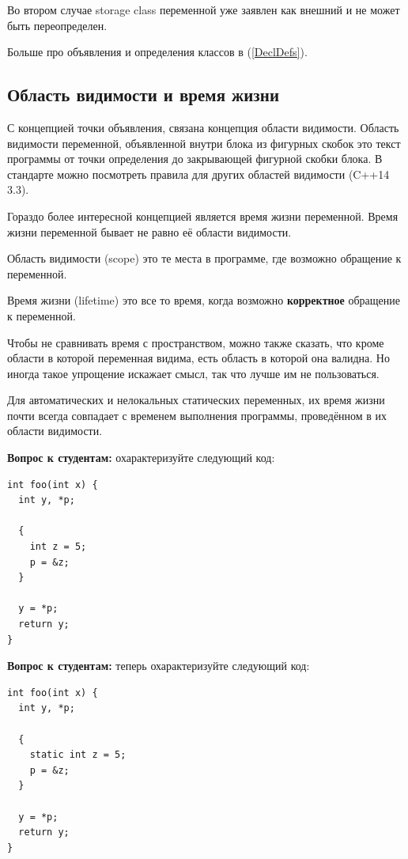 \documentclass[a4paper,12pt,oneside]{book}
\newif\ifanswers
\begin{document}
Во втором случае storage class переменной уже заявлен как внешний и не может быть переопределен.

Больше про объявления и определения классов в (\ref{DeclDefs}).

\subsection{Область видимости и время жизни}\label{ScopeLifeTime}

С концепцией точки объявления, связана концепция области видимости. Область видимости  переменной, объявленной внутри блока из фигурных скобок это текст программы от точки определения до закрывающей фигурной скобки блока. В стандарте можно посмотреть правила для других областей видимости (C++14 3.3).

Гораздо более интересной концепцией является время жизни переменной. Время жизни переменной бывает не равно её области видимости.

Область видимости (scope) это те места в программе, где возможно обращение к переменной.

Время жизни (lifetime) это все то время, когда возможно \textbf{корректное} обращение к переменной.

Чтобы не сравнивать время с пространством, можно также сказать, что кроме области в которой переменная видима, есть область в которой она валидна. Но иногда такое упрощение искажает смысл, так что лучше им не пользоваться.

Для автоматических и нелокальных статических переменных, их время жизни почти всегда совпадает с временем выполнения программы, проведённом в их области видимости.

\textbf{Вопрос к студентам:} охарактеризуйте следующий код:

\begin{lstlisting}
int foo(int x) {
  int y, *p;

  {
    int z = 5; 
    p = &z;
  }

  y = *p;
  return y;
}
\end{lstlisting}

\ifanswers
Правильный ответ: этот код демонстрирует undefined behavior. В точке разыменования указателя истекло время жизни того, на что он указывает.
\fi

\textbf{Вопрос к студентам:} теперь охарактеризуйте следующий код:

\begin{lstlisting}
int foo(int x) {
  int y, *p;

  {
    static int z = 5; 
    p = &z;
  }

  y = *p;
  return y;
}
\end{lstlisting}
\end{document}
